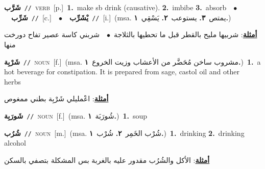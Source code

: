 \documentclass[10pt,a4paper,twoside]{article} %
\begin{document}
\begin{multicols}{2}
{\setlength\topsep{0pt}\textbf{\foreignlanguage{arabic}{شَرَّب}}\ {\color{gray}\texttt{//}\color{black}}\ \textsc{verb}\ [p.]\ \textbf{1.}~make sb drink (causative).  \textbf{2.}~imbibe  \textbf{3.}~absorb\ \ $\bullet$\ \ \setlength\topsep{0pt}\textbf{\foreignlanguage{arabic}{شَرِّب}}\ {\color{gray}\texttt{//}\color{black}}\ [c.]\ \ $\bullet$\ \ \setlength\topsep{0pt}\textbf{\foreignlanguage{arabic}{يْشَرِّب}}\ {\color{gray}\texttt{//}\color{black}}\ [i.]\ \color{gray}(msa. \foreignlanguage{arabic}{يمتص}~\foreignlanguage{arabic}{\textbf{٣.}}  \foreignlanguage{arabic}{يستوعب}~\foreignlanguage{arabic}{\textbf{٢.}}  \foreignlanguage{arabic}{يَسْقِي}~\foreignlanguage{arabic}{\textbf{١.}})\color{black}\  \begin{flushright}\color{gray}\foreignlanguage{arabic}{\textbf{\underline{\foreignlanguage{arabic}{أمثلة}}}: شربيها مليح بالقطر قبل ما تحطيها بالثلاجة\ $\bullet$\ \  شربني كاسة عصير تفاح دورخت منها}\end{flushright}\color{black}} \vspace{2mm}

{\setlength\topsep{0pt}\textbf{\foreignlanguage{arabic}{شَرْبِة}}\ {\color{gray}\texttt{//}\color{black}}\ \textsc{noun}\ [f.]\ \color{gray}(msa. \foreignlanguage{arabic}{مشروب ساخن مُحَضَّر من الأعشاب وزيت الخروع}~\foreignlanguage{arabic}{\textbf{١.}})\color{black}\ \textbf{1.}~a hot beverage for constipation. It is prepared from sage, castol oil and other herbs\  \begin{flushright}\color{gray}\foreignlanguage{arabic}{\textbf{\underline{\foreignlanguage{arabic}{أمثلة}}}: اعْمليلي شَرْبِة بطني ممغوص}\end{flushright}\color{black}} \vspace{2mm}

{\setlength\topsep{0pt}\textbf{\foreignlanguage{arabic}{شَورَبِة}}\ {\color{gray}\texttt{//}\color{black}}\ \textsc{noun}\ [f.]\ \color{gray}(msa. \foreignlanguage{arabic}{شُورَبَة}~\foreignlanguage{arabic}{\textbf{١.}})\color{black}\ \textbf{1.}~soup\ } \vspace{2mm}

{\setlength\topsep{0pt}\textbf{\foreignlanguage{arabic}{شُرُب}}\ {\color{gray}\texttt{//}\color{black}}\ \textsc{noun}\ [m.]\ \color{gray}(msa. \foreignlanguage{arabic}{شُرْب الخَمِر}~\foreignlanguage{arabic}{\textbf{٢.}}  \foreignlanguage{arabic}{شُرْب}~\foreignlanguage{arabic}{\textbf{١.}})\color{black}\ \textbf{1.}~drinking  \textbf{2.}~drinking alcohol\  \begin{flushright}\color{gray}\foreignlanguage{arabic}{\textbf{\underline{\foreignlanguage{arabic}{أمثلة}}}: الأكل والشُرُب مقدور عليه بالغربة بس المشكلة بتصفي بالسكن}\end{flushright}\color{black}} \vspace{2mm}


\end{multicols}
\end{document}
